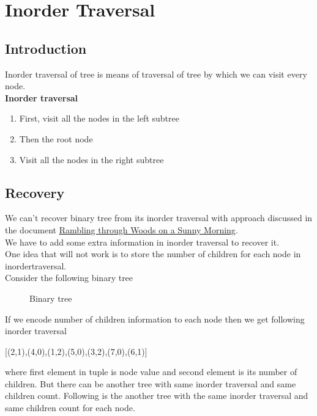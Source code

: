 \documentclass[10pt,a4paper]{article}%
\begin{document}
\pagestyle{noweb}
\nwdocspar
\section{Inorder Traversal}
\subsection{Introduction}
Inorder traversal of tree is means of traversal of tree by which we can visit every node.\\
\textbf{Inorder traversal}
\begin{enumerate}
\item First, visit all the nodes in the left subtree
\item Then the root node
\item Visit all the nodes in the right subtree
\end{enumerate}
\subsection{Recovery}
We can't recover binary tree from its inorder traversal with approach discussed in the document \href{http://www.cse.iitd.ernet.in/~sak/courses/ilfp/recover.pdf}{Rambling through Woods on a Sunny Morning}. \\
We have to add some extra information in inorder traversal to recover it. \\
One idea that will not work is to store the number of children for each node in inordertraversal. \\
Consider the following binary tree

\begin{figure}[h!]
\begin{center}
\end{center}
\caption{Binary tree}
\end{figure}

If we encode number of children information to each node then we get following inorder traversal
\begin{center} 
        [(2,1),(4,0),(1,2),(5,0),(3,2),(7,0),(6,1)]
\end{center}
where first element in tuple is node value and second element is its number of children. But there can be another tree with same inorder traversal and same children count. Following is the another tree with the same inorder traversal and same children count for each node.
\end{document}

